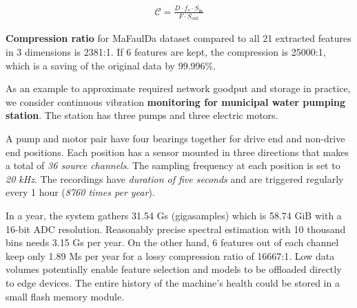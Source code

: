 \begin{ceqn}\begin{align} \label{equ:compression-ratio-features}
\mathcal{C} = \frac{D \cdot f_s \cdot S_{\mathrm{in}}}{F \cdot S_{\mathrm{out}}}
\end{align}\end{ceqn}

\textbf{Compression ratio} for MaFaulDa dataset compared to all 21 extracted features in 3 dimensions is 2381:1. If 6 features are kept, the compression is 25000:1, which is a saving of the original data by 99.996\%.

As an example to approximate required network goodput and storage in practice, we consider continuous vibration \textbf{monitoring for municipal water pumping station}. The station has three pumps and three electric motors. 

A pump and motor pair have four bearings together for drive end and non-drive end positions. Each position has a sensor mounted in three directions that makes a total of \emph{36 source channels}. The sampling frequency at each position is set to \emph{20 kHz}. The recordings have \emph{duration of five seconds} and are triggered regularly every 1 hour (\emph{8760 times per year}).

In a year, the system gathers 31.54 Gs (gigasamples) which is 58.74 GiB with a 16-bit ADC resolution. Reasonably precise spectral estimation with 10 thousand bins needs 3.15 Gs per year. On the other hand, 6 features out of each channel keep only 1.89 Ms per year for a lossy compression ratio of 16667:1. Low data volumes potentially enable feature selection and models to be offloaded directly to edge devices. The entire history of the machine's health could be stored in a small flash memory module.
